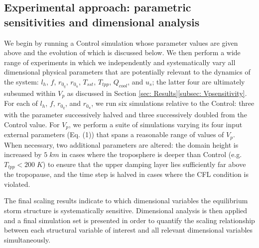 \documentclass[12pt]{article}
\begin{document}
\subsection{Experimental approach: parametric sensitivities and dimensional analysis}
We begin by running a Control simulation whose parameter values are given above and the evolution of which is discussed below.  We then perform a wide range of experiments in which we independently and systematically vary all dimensional physical parameters that are potentially relevant to the dynamics of the system: $l_h$, $f$, $r_{0_q}$, $r_{0_u}$, $T_{sst}$, $T_{tpp}$, $Q_{cool}$, and $u_s$; the latter four are ultimately subsumed within $V_p$ as discussed in Section \ref{sec: Results}\ref{subsec: Vpsensitivity}.  For each of $l_h$, $f$, $r_{0_q}$, and $r_{0_u}$, we run six simulations relative to the Control: three with the parameter successively halved and three successively doubled from the Control value.  For $V_p$, we perform a suite of simulations varying its four input external parameters (Eq. (1)) that spans a reasonable range of values of $V_p$. When necessary, two additional parameters are altered: the domain height is increased by $5 \; km$ in cases where the troposphere is deeper than Control (e.g. $T_{tpp} < 200 \; K$) to ensure that the upper damping layer lies sufficiently far above the tropopause, and the time step is halved in cases where the CFL condition is violated.

The final scaling results indicate to which dimensional variables the equilibrium storm structure is systematically sensitive.  Dimensional analysis is then applied and a final simulation set is presented in order to quantify the scaling relationship between each structural variable of interest and all relevant dimensional variables simultaneously.
\end{document}
